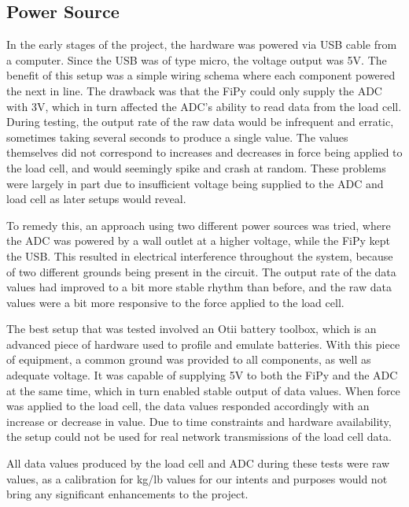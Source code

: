 
\subsection{Power Source}
In the early stages of the project, the hardware was powered via USB cable from a computer. Since the USB was of type micro, the voltage output was 5V. The benefit of this setup was a simple wiring schema where each component powered the next in line. The drawback was that the FiPy could only supply the ADC with 3V, which in turn affected the ADC's ability to read data from the load cell. During testing, the output rate of the raw data would be infrequent and erratic, sometimes taking several seconds to produce a single value. The values themselves did not correspond to increases and decreases in force being applied to the load cell, and would seemingly spike and crash at random. These problems were largely in part due to insufficient voltage being supplied to the ADC and load cell as later setups would reveal.

To remedy this, an approach using two different power sources was tried, where the ADC was powered by a wall outlet at a higher voltage, while the FiPy kept the USB. This resulted in electrical interference throughout the system, because of two different grounds being present in the circuit. The output rate of the data values had improved to a bit more stable rhythm than before, and the raw data values were a bit more responsive to the force applied to the load cell. 

The best setup that was tested involved an Otii battery toolbox, which is an advanced piece of hardware used to profile and emulate batteries.\cite{otii-web} With this piece of equipment, a common ground was provided to all components, as well as adequate voltage. It was capable of supplying 5V to both the FiPy and the ADC at the same time, which in turn enabled stable output of data values. When force was applied to the load cell, the data values responded accordingly with an increase or decrease in value. Due to time constraints and hardware availability, the setup could not be used for real network transmissions of the load cell data.

All data values produced by the load cell and ADC during these tests were raw values, as a calibration for kg/lb values for our intents and purposes would not bring any significant enhancements to the project.

